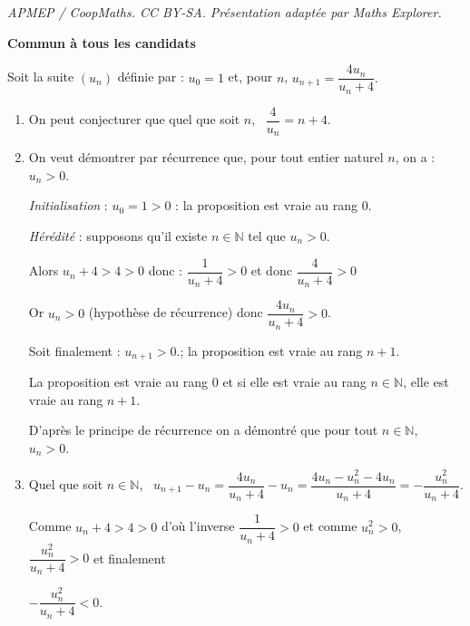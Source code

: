 \documentclass[10pt]{article}
\providecommand{\N}{\mathbb{N}}
\begin{document}
\noindent\textit{APMEP / CoopMaths. CC BY-SA. Présentation adaptée par Maths Explorer.}\par\medskip
\textbf{Commun à tous les candidats}

\medskip

Soit la suite $\left(u_n\right)$ définie par : $u_0 = 1$ et, pour $n$,
$ u_{n+1}  = \dfrac{4u_n}{u_n + 4}.$

\smallskip

\begin{enumerate}
\item


























On peut conjecturer que quel que soit $n$, \, $\dfrac{4}{u_n} = n + 4$.
\item On veut démontrer par récurrence que, pour tout entier naturel $n$, on a : $u_n > 0$.

\emph{Initialisation} : $u_0 = 1 > 0$ : la proposition est vraie au rang $0$.

\emph{Hérédité} : supposons qu'il existe $n \in \N$ tel que $u_n > 0$.

Alors $u_n + 4  >4 > 0$ donc : $ \dfrac{1}{u_n + 4} >0$ et donc $ \dfrac{4}{u_n + 4} >0$

Or $u_n>0$ (hypothèse de récurrence) donc $\dfrac{4u_n}{u_n + 4}>0$.

Soit finalement : $u_{n+1} >0$.; la proposition est vraie au rang $n + 1$.

La proposition est vraie au rang $0$ et si elle est vraie au rang $n \in \N$, elle est vraie au rang $n + 1$.

D'après le principe de récurrence on a démontré que pour tout $n \in \N$, \, $u_n > 0$.
\item 
Quel que soit $n \in \N$, \, $u_{n+1} - u_n = \dfrac{4u_n}{u_n + 4} - u_n = \dfrac{4u_n - u_n^2 - 4u_n}{u_n + 4} = - \dfrac{u_n^2}{u_n + 4}$.

Comme $u_n + 4 > 4 > 0$ d'où l'inverse $\dfrac{1}{u_n + 4} > 0$ et comme $u_n^2 > 0$, $\dfrac{u_n^2}{u_n + 4} > 0$ et finalement 

$- \dfrac{u_n^2}{u_n + 4} < 0$.


\end{enumerate}
\end{document}
